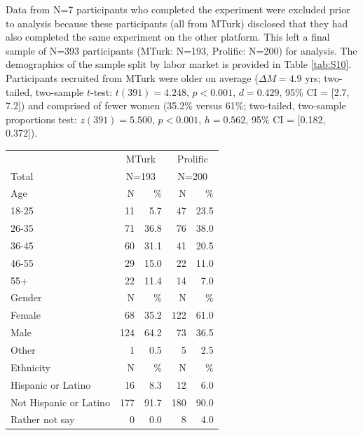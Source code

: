 \documentclass[a4paper,notitlepage,12pt]{article}
\begin{document}
Data from N=7 participants who completed the experiment were excluded prior to analysis because these participants (all from MTurk) disclosed that they had also completed the same experiment on the other platform. This left a final sample of N=393 participants (MTurk: N=193, Prolific: N=200) for analysis. The demographics of the sample split by labor market is provided in Table \ref{tab:S10}. Participants recruited from MTurk were older on average ($\Delta M = 4.9$ yrs; two-tailed, two-sample $t$-test: $t(391)=4.248$, $p<0.001$, $d = 0.429$, 95\% CI = [2.7, 7.2]) and comprised of fewer women (35.2\% versus 61\%; two-tailed, two-sample proportions test: $z(391)=5.500$, $p<0.001$, $h=0.562$, 95\% CI = [0.182, 0.372]). 

\begin{table}[!h]
    \centering
    \small
    \setlength{\tabcolsep}{15pt}
    \begin{tabular}{lrrrr}
        \toprule
        & \multicolumn{2}{c}{MTurk} & \multicolumn{2}{c}{Prolific} \\
        \cmidrule(lr){2-3} \cmidrule(lr){4-5}
        Total & \multicolumn{2}{c}{N=193} & \multicolumn{2}{c}{N=200} \\
        \midrule
        Age & N & \% & N & \% \\
        \cmidrule(lr){1-5}
        18-25   &    11 &   5.7 &     47 &  23.5 \\
        26-35   &    71 &  36.8 &     76 &  38.0 \\
        36-45   &    60 &  31.1 &     41 &  20.5 \\
        46-55   &    29 &  15.0 &     22 &  11.0 \\
        55+     &    22 &  11.4 &     14 &   7.0 \\
        \midrule
        Gender & N & \% & N & \% \\
        \cmidrule(lr){1-5}
        Female &      68 &  35.2 &      122 &  61.0 \\
        Male   &     124 &  64.2 &       73 &  36.5 \\
        Other  &       1 &   0.5 &        5 &   2.5 \\
        \midrule
        Ethnicity & N & \% & N & \% \\
        \cmidrule(lr){1-5}
        Hispanic or Latino     &    16 &   8.3 &     12 &   6.0 \\
        Not Hispanic or Latino &   177 &  91.7 &    180 &  90.0 \\
        Rather not say         &     0 &   0.0 &      8 &   4.0 \\

\end{tabular}
\end{table}
\end{document}
